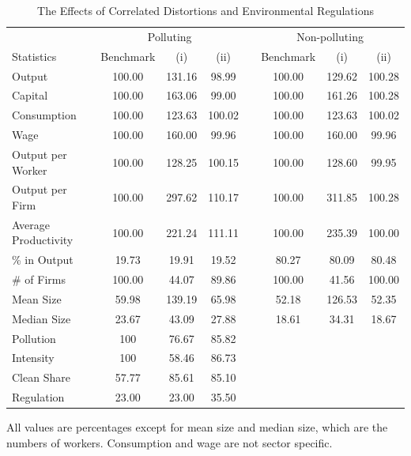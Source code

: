 \documentclass[AEJ]{AEA}
\begin{document}
\begin{table}[t]
\footnotesize
\centering
\caption{The Effects of Correlated Distortions and Environmental Regulations}
\begin{tabular}{lccccccc}
    \hline \hline
                         & \multicolumn{3}{c}{Polluting}    & & \multicolumn{3}{c}{Non-polluting} \\
    \cmidrule{2-4} \cmidrule{6-8}
    Statistics           & Benchmark & (i)      & (ii)      & & Benchmark     & (i)    & (ii) \\
    \hline
    Output               & 100.00    & 131.16   & 98.99     & & 100.00        & 129.62 & 100.28 \\
    Capital              & 100.00    & 163.06   & 99.00     & & 100.00        & 161.26 & 100.28 \\
    Consumption          & 100.00    & 123.63   & 100.02    & & 100.00        & 123.63 & 100.02 \\
    Wage                 & 100.00    & 160.00   & 99.96     & & 100.00        & 160.00 &  99.96 \\
    Output per Worker    & 100.00    & 128.25   & 100.15    & & 100.00        & 128.60 &  99.95 \\
    Output per Firm      & 100.00    & 297.62   & 110.17    & & 100.00        & 311.85 & 100.28 \\
    Average Productivity & 100.00    & 221.24   & 111.11    & & 100.00        & 235.39 & 100.00 \\
    \% in Output         & 19.73     & 19.91    & 19.52     & &  80.27        & 80.09  &  80.48 \\
    \hline
    \# of Firms          & 100.00    & 44.07    & 89.86     & & 100.00        & 41.56  & 100.00 \\
    Mean Size            & 59.98     & 139.19   & 65.98     & & 52.18         & 126.53 &  52.35 \\
    Median Size          & 23.67     & 43.09    & 27.88     & & 18.61         & 34.31  & 18.67  \\
    \hline
    Pollution            & 100       & 76.67    & 85.82     \\
    Intensity            & 100       & 58.46    & 86.73    \\
    Clean Share          & 57.77     & 85.61    & 85.10     \\
    Regulation           & 23.00     & 23.00    & 35.50     \\
    \hline
\end{tabular}
\begin{tablenotes}
     All values are percentages except for mean size and median size, which are the numbers of workers. Consumption and wage are not sector specific.
\end{tablenotes}
\label{tab:aggregates}
\end{table}
\end{document}
